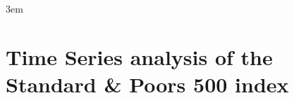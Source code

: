 \documentclass[10pt,twoside]{book}
\begin{document}
\emergencystretch 3em

\frontmatter

\chapter{Time Series analysis of the Standard \& Poors 500 index}
\tableofcontents %

\mainmatter

% 

% 

% 

% 

% 


% 


% 
\end{document}
